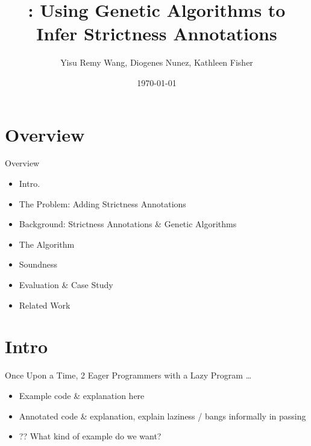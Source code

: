 \documentclass{beamer}
\title[Title]{\tname{} : Using Genetic Algorithms to Infer Strictness Annotations}
\author{Yisu Remy Wang, Diogenes Nunez, Kathleen Fisher}
\institute{Tufts University, Medford MA, USA}
\date{\today}
\begin{document}
\begin{frame}
  \titlepage
\end{frame}


\section{Overview}

\begin{frame}{Overview}

\begin{itemize}
  \item Intro. 
  \item The Problem: Adding Strictness Annotations
  \item Background: Strictness Annotations \& Genetic Algorithms
  \item The Algorithm
  \item Soundness
  \item Evaluation \& Case Study
  \item Related Work
  
\end{itemize}

%

\end{frame}

%

\section{Intro}
\begin{frame}{Once Upon a Time, 2 Eager Programmers with a Lazy Program \dots}
\begin{itemize}
\item Example code \& explanation here
\item Annotated code \& explanation, explain laziness / bangs informally in passing
\item ?? What kind of example do we want?
\end{itemize}
\end{frame}
\end{document}
